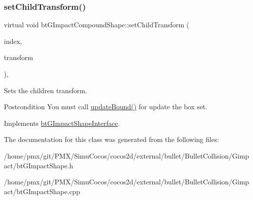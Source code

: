 \subsubsection{\texorpdfstring{set\+Child\+Transform()}{setChildTransform()}\hspace{0.1cm}{\footnotesize\ttfamily [2/2]}}
{\footnotesize\ttfamily virtual void bt\+G\+Impact\+Compound\+Shape\+::set\+Child\+Transform (\begin{DoxyParamCaption}\item[{int}]{index,  }\item[{const bt\+Transform \&}]{transform }\end{DoxyParamCaption})\hspace{0.3cm}{\ttfamily [inline]}, {\ttfamily [virtual]}}



Sets the children transform. 

\begin{DoxyPostcond}{Postcondition}
You must call \hyperlink{classbtGImpactShapeInterface_acb26c2d7a2aecabd06b996b72b848492}{update\+Bound()} for update the box set. 
\end{DoxyPostcond}


Implements \hyperlink{classbtGImpactShapeInterface_a83392f97bd7dfeb71ccdce6913a465b0}{bt\+G\+Impact\+Shape\+Interface}.



The documentation for this class was generated from the following files\+:\begin{DoxyCompactItemize}
\item 
/home/pmx/git/\+P\+M\+X/\+Simu\+Cocos/cocos2d/external/bullet/\+Bullet\+Collision/\+Gimpact/bt\+G\+Impact\+Shape.\+h\item 
/home/pmx/git/\+P\+M\+X/\+Simu\+Cocos/cocos2d/external/bullet/\+Bullet\+Collision/\+Gimpact/bt\+G\+Impact\+Shape.\+cpp\end{DoxyCompactItemize}
